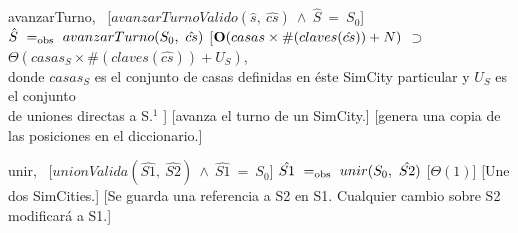 \begin{Interfaz}
    \vspace{4mm}
    \InterfazFuncion
    {avanzarTurno}{,\ }{}
    [$avanzarTurnoValido(\hat{s},\ \hat{cs})\ \land\ \hat{S}\ =\ S_0$]
    {$\hat{S}\ \igobs\ avanzarTurno(S_0,\ \hat{cs})$}
    [$\bold{O}(casas \times \#(claves(\hat{cs})) + N)$ $\supset$ $\Theta(casas_{S} \times \#(claves(\hat{cs})) + U_S)$, \\ \tab
        donde $casas_{S}$ es el conjunto de casas definidas en éste SimCity particular y $U_S$ es el conjunto \\
        \tab de uniones directas a S.$^{1}$
    ]
    [avanza el turno de un SimCity.]
    [genera una copia de las posiciones en el diccionario.]

    \vspace{4mm}
    \InterfazFuncion
    {unir}{,\ }{}
    [$unionValida(\hat{S1},\ \hat{S2})\ \land\ \hat{S1}\ =\ S_0$]
    {$\hat{S1}\ \igobs\ unir(S_0,\ \hat{S2})$}
    [$\Theta(1)$]
    [Une dos SimCities.]
    [Se guarda una referencia a S2 en S1. Cualquier cambio sobre S2 modificará a S1.]

    \vfill{}
\end{Interfaz}